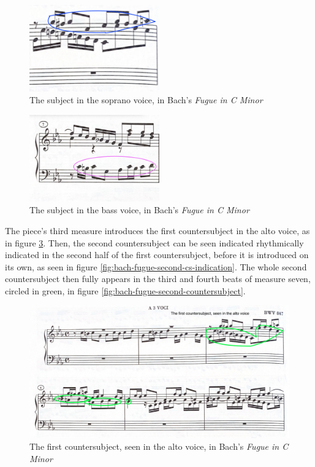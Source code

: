 \begin{figure}
    \centering
    \includegraphics[width=0.5\textwidth]{figures/bach-fugue-soprano-subject.png}
    \caption{The subject in the soprano voice, in Bach's \textit{Fugue in C Minor}}
    \label{fig:bach-soprano-subject}
\end{figure}

\begin{figure}
    \centering
    \includegraphics[width=0.5\textwidth]{figures/bach-fugue-bass-subject.png}
    \caption{The subject in the bass voice, in Bach's \textit{Fugue in C Minor}}
    \label{fig:bach-bass-subject}
\end{figure}

The piece's third measure introduces the first countersubject in the alto voice, as in figure \ref{fig:bach-fugue-first-countersubject}\autocite{Henle_2009}. Then, the second countersubject can be seen indicated rhythmically indicated in the second half of the first countersubject, before it is introduced on its own, as seen in figure \ref{fig:bach-fugue-second-cs-indication}\autocite{Henle_2009}. The whole second countersubject then fully appears in the third and fourth beats of measure seven, circled in green, in figure \ref{fig:bach-fugue-second-countersubject}\autocite{Henle_2009}.

\begin{figure}
    \centering
    \includegraphics[width=\textwidth]{figures/bach-fugue-first-countersubject.png}
    \caption{The first countersubject, seen in the alto voice, in Bach's \textit{Fugue in C Minor}}
    \label{fig:bach-fugue-first-countersubject}
\end{figure}

